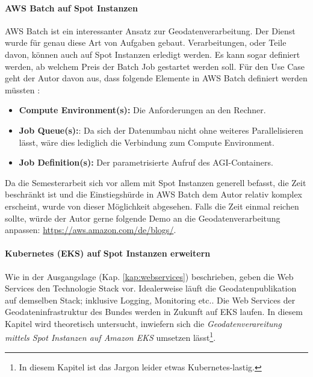 \paragraph{AWS Batch auf Spot Instanzen}
AWS Batch ist ein interessanter Ansatz zur Geodatenverarbeitung. Der Dienst wurde für genau diese Art von Aufgaben gebaut. Verarbeitungen, oder Teile davon, können auch auf Spot Instanzen erledigt werden. Es kann sogar definiert werden, ab welchem Preis der Batch Job gestartet werden soll. Für den Use Case geht der Autor davon aus, dass folgende Elemente in AWS Batch definiert werden müssten \cite{Batch2020}: 
\begin{itemize}
\item{\textbf{Compute Environment(s):} Die Anforderungen an den Rechner.}
\item{\textbf{Job Queue(s):}: Da sich der Datenumbau nicht ohne weiteres Parallelisieren lässt, wäre dies lediglich die Verbindung zum Compute Environment.}
\item{\textbf{Job Definition(s):}} Der parametrisierte Aufruf des AGI-Containers.
\end{itemize}
Da die Semesterarbeit sich vor allem mit Spot Instanzen generell befasst, die Zeit beschränkt ist und die Einstiegshürde in AWS Batch dem Autor relativ komplex erscheint, wurde von dieser Möglichkeit abgesehen. Falls die Zeit einmal reichen sollte, würde der Autor gerne folgende Demo an die Geodatenverarbeitung anpassen:
\href{https://aws.amazon.com/de/blogs/compute/creating-a-simple-fetch-and-run-aws-batch-job/}{https://aws.amazon.com/de/blogs/}.

\paragraph{Kubernetes (EKS) auf Spot Instanzen erweitern}
Wie in der Ausgangslage (Kap. \ref{kap:webservices}) beschrieben, geben die Web Services den Technologie Stack vor. Idealerweise läuft die Geodatenpublikation auf demselben Stack; inklusive Logging, Monitoring etc.. 
Die Web Services der Geodateninfrastruktur des Bundes werden in Zukunft auf EKS laufen. In diesem Kapitel wird theoretisch untersucht, inwiefern sich die \textit{Geodatenverareitung mittels Spot Instanzen auf Amazon EKS} umsetzen lässt\footnote{In diesem Kapitel ist das Jargon leider etwas Kubernetes-lastig.}. 

